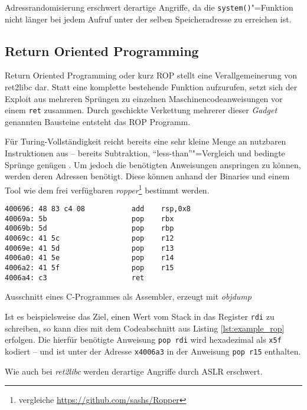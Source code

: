 Adressrandomisierung erschwert derartige Angriffe, da die \texttt{system()}"=Funktion nicht länger bei jedem Aufruf unter der selben Speicheradresse zu erreichen ist.

\subsection{Return Oriented Programming}

Return Oriented Programming oder kurz ROP stellt eine Verallgemeinerung von ret2libc dar. Statt eine komplette bestehende Funktion aufzurufen, setzt sich der Exploit aus mehreren Sprüngen zu einzelnen Maschinencodeanweisungen vor einem \texttt{ret} zusammen. Durch geschickte Verkettung mehrerer dieser \emph{Gadget} genannten Bausteine entsteht das ROP Programm.

Für Turing-Vollständigkeit reicht bereits eine sehr kleine Menge an nutzbaren Instruktionen aus -- bereits Subtraktion, \enquote{less-than}"=Vergleich und bedingte Sprünge genügen \cite[S.3]{Homescu.2012}. Um jedoch die benötigten Anweisungen anspringen zu können, werden deren Adressen benötigt. Diese können anhand der Binaries und einem Tool wie dem frei verfügbaren \emph{ropper}\footnote{vergleiche \url{https://github.com/sashs/Ropper}} bestimmt werden.

\begin{listing}
\begin{verbatim}
400696: 48 83 c4 08           add    rsp,0x8
40069a: 5b                    pop    rbx
40069b: 5d                    pop    rbp
40069c: 41 5c                 pop    r12
40069e: 41 5d                 pop    r13
4006a0: 41 5e                 pop    r14
4006a2: 41 5f                 pop    r15
4006a4: c3                    ret
\end{verbatim}
\caption{Ausschnitt eines C-Programmes als Assembler, erzeugt mit \emph{objdump}}
\label{lst:example_rop}
\end{listing}

Ist es beispielsweise das Ziel, einen Wert vom Stack in das Register \texttt{rdi} zu schreiben, so kann dies mit dem Codeabschnitt aus Listing \ref{lst:example_rop} erfolgen. Die hierfür benötigte Anweisung \texttt{pop rdi} wird hexadezimal als \texttt{x5f} kodiert -- und ist unter der Adresse \texttt{x4006a3} in der Anweisung \texttt{pop r15} enthalten.

Wie auch bei \emph{ret2libc} werden derartige Angriffe durch ASLR erschwert.

